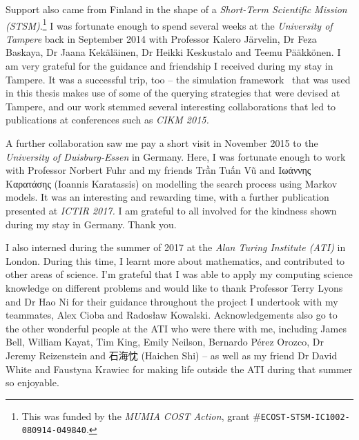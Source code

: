 \begin{preamble}
Support also came from Finland in the shape of a \emph{Short-Term Scientific Mission (STSM)}.\footnote{This was funded by the \emph{MUMIA COST Action}, grant \#\texttt{ECOST-STSM-IC1002-080914-049840}.} I was fortunate enough to spend several weeks at the \emph{University of Tampere} back in September 2014 with Professor Kalero J\"{a}rvelin, Dr Feza Baskaya, Dr Jaana Kek\"{a}l\"{a}inen, Dr Heikki Keskustalo and Teemu P\"{a}\"{a}kk\"{o}nen. I am very grateful for the guidance and friendship I received during my stay in Tampere. It was a successful trip, too -- the simulation framework \simiir~that was used in this thesis makes use of some of the querying strategies that were devised at Tampere, and our work stemmed several interesting collaborations that led to publications at conferences such as \emph{CIKM 2015.}

A further collaboration saw me pay a short visit in November 2015 to the \emph{University of Duisburg-Essen} in Germany. Here, I was fortunate enough to work with Professor Norbert Fuhr and my friends Trần Tuấn Vũ and Ιωάννης Καρατάσης (Ioannis Karatassis) on modelling the search process using Markov models. It was an interesting and rewarding time, with a further publication presented at \emph{ICTIR 2017.} I am grateful to all involved for the kindness shown during my stay in Germany. Thank you.

I also interned during the summer of 2017 at the \emph{Alan Turing Institute (ATI)} in London. During this time, I learnt more about mathematics, and contributed to other areas of science. I'm grateful that I was able to apply my computing science knowledge on different problems and would like to thank Professor Terry Lyons and Dr Hao Ni for their guidance throughout the project I undertook with my teammates, Alex Cioba and Rados\l{}aw Kowalski. Acknowledgements also go to the other wonderful people at the ATI who were there with me, including James Bell, William Kayat, Tim King, Emily Neilson, Bernardo P\'{e}rez Orozco, Dr Jeremy Reizenstein and {\asianfont 石海忱} (Haichen Shi) -- as well as my friend Dr David White and Faustyna Krawiec for making life outside the ATI during that summer so enjoyable.


\end{preamble}
